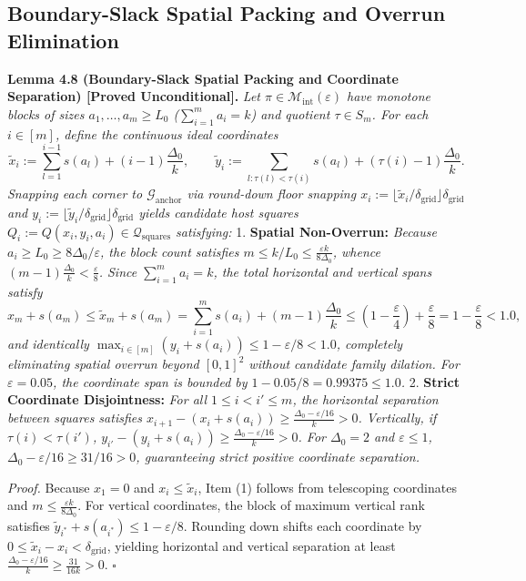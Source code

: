 \documentclass[
  11pt,
]{article}
\begin{document}
\subsection{Boundary-Slack Spatial Packing and Overrun
Elimination}\label{boundary-slack-spatial-packing-and-overrun-elimination}

\textbf{Lemma 4.8 (Boundary-Slack Spatial Packing and Coordinate Separation) [Proved Unconditional].} \emph{Let
\(\pi \in \mathcal{M}_{\mathrm{int}}(\varepsilon)\) have monotone blocks
of sizes \(a_1, \dots, a_m \ge L_0\) (\(\sum_{i=1}^m a_i = k\)) and
quotient \(\tau \in S_m\). For each \(i \in [m]\), define the continuous
ideal coordinates} \[
\tilde{x}_i := \sum_{l=1}^{i-1} s(a_l) + (i - 1)\frac{\Delta_0}{k}, \qquad \tilde{y}_i := \sum_{l : \tau(l) < \tau(i)} s(a_l) + (\tau(i) - 1)\frac{\Delta_0}{k}.
\] \emph{Snapping each corner to \(\mathcal{G}_{\mathrm{anchor}}\) via
round-down floor snapping
\(x_i := \lfloor \tilde{x}_i / \delta_{\mathrm{grid}} \rfloor \delta_{\mathrm{grid}}\)
and
\(y_i := \lfloor \tilde{y}_i / \delta_{\mathrm{grid}} \rfloor \delta_{\mathrm{grid}}\)
yields candidate host squares
\(Q_i := Q(x_i, y_i, a_i) \in \mathcal{Q}_{\mathrm{squares}}\)
satisfying:} 1. \textbf{Spatial Non-Overrun:} \emph{Because
\(a_i \ge L_0 \ge 8\Delta_0/\varepsilon\), the block count satisfies
\(m \le k/L_0 \le \frac{\varepsilon k}{8\Delta_0}\), whence
\((m - 1)\frac{\Delta_0}{k} < \frac{\varepsilon}{8}\). Since
\(\sum_{i=1}^m a_i = k\), the total horizontal and vertical spans
satisfy} \[
   x_m + s(a_m) \le \tilde{x}_m + s(a_m) = \sum_{i=1}^m s(a_i) + (m - 1)\frac{\Delta_0}{k} \le \left(1 - \frac{\varepsilon}{4}\right) + \frac{\varepsilon}{8} = 1 - \frac{\varepsilon}{8} < 1.0,
   \] \emph{and identically
\(\max_{i \in [m]} (y_i + s(a_i)) \le 1 - \varepsilon/8 < 1.0\),
completely eliminating spatial overrun beyond \([0, 1]^2\) without
candidate family dilation. For \(\varepsilon = 0.05\), the coordinate
span is bounded by \(1 - 0.05/8 = 0.99375 \le 1.0\).} 2. \textbf{Strict
Coordinate Disjointness:} \emph{For all \(1 \le i < i' \le m\), the
horizontal separation between squares satisfies
\(x_{i+1} - (x_i + s(a_i)) \ge \frac{\Delta_0 - \varepsilon/16}{k} > 0\).
Vertically, if \(\tau(i) < \tau(i')\),
\(y_{i'} - (y_i + s(a_i)) \ge \frac{\Delta_0 - \varepsilon/16}{k} > 0\).
For \(\Delta_0 = 2\) and \(\varepsilon \le 1\),
\(\Delta_0 - \varepsilon/16 \ge 31/16 > 0\), guaranteeing strict
positive coordinate separation.}

\emph{Proof.} Because \(x_1 = 0\) and \(x_i \le \tilde{x}_i\), Item (1)
follows from telescoping coordinates and
\(m \le \frac{\varepsilon k}{8\Delta_0}\). For vertical coordinates, the
block of maximum vertical rank satisfies
\(\tilde{y}_{i^*} + s(a_{i^*}) \le 1 - \varepsilon/8\). Rounding down
shifts each coordinate by
\(0 \le \tilde{x}_i - x_i < \delta_{\mathrm{grid}}\), yielding
horizontal and vertical separation at least
\(\frac{\Delta_0 - \varepsilon/16}{k} \ge \frac{31}{16k} > 0\).
\(\square\)
\end{document}
